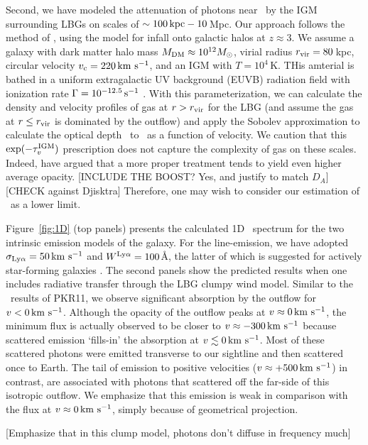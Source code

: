 \documentclass[12pt,preprint]{aastex}
\begin{document}
Second, we have modeled the attenuation of photons near \lya\ by the
IGM surrounding LBGs on scales of $\sim 100\,
{\rm kpc} - 10$\,Mpc.  Our approach follows the method of
\cite{santos04}, using the \cite{barkana04} model for infall onto
galactic halos at $z \approx 3$.  We assume a galaxy with dark matter
halo mass $M_{\rm DM} \approx 10^{12} M_\odot$, virial radius $r_{\rm vir} 
= 80$\,kpc, circular velocity $v_{\rm c} = 220 \, {\rm km~s^{-1}}$, and an
IGM with $T = 10^4$\,K.  THis amterial is bathed in a uniform
extragalactic UV
background (EUVB) radiation field with ionization rate $\Gamma =
10^{-12.5} \, \rm s^{-1}$ \citep{fpl+08}.  With this parameterization,
we can calculate the density and velocity profiles of gas at $r >
r_{\rm vir}$ for the LBG (and assume the gas at $r\le r_{\rm vir}$ is dominated by
the outflow) and apply the Sobolev approximation to calculate the
optical depth \tigm\ to \lya\ as a function of velocity.
We caution that
this $\exp(-\tau_v^{\rm IGM})$ prescription does not capture the complexity of
gas on these scales.  Indeed, \cite{zheng10a} have argued that a more
proper treatment tends to yield even higher average opacity.
[INCLUDE THE BOOST? Yes, and justify to match $D_A$]
[CHECK against Djisktra]
Therefore, one may wish to consider our estimation of \tigm\ as a
lower limit.

Figure~\ref{fig:1D} (top panels) presents the 
calculated 1D \lya\ spectrum for the
two intrinsic emission models of the galaxy.
For the line-emission, we have adopted $\sigma_{\rm Ly\alpha} =
50\, {\rm km~s^{-1}}$ and $W^{\rm Ly\alpha} = 100$\AA, the latter of which is suggested for
actively star-forming galaxies \citep{lya_emit}.
The second panels show the predicted results when one includes
radiative transfer through the LBG clumpy wind model.  Similar to the \mgii\
results of PKR11, we observe significant absorption by the outflow for
$v < 0\, {\rm km~s^{-1}}$.  
Although the opacity of the outflow peaks at $v \approx 0 \, {\rm km~s^{-1}}$, the
minimum flux is actually observed to be closer to $v \approx -300
\, {\rm km~s^{-1}}$ because
scattered emission `fills-in' the absorption at $v \lesssim 0
\, {\rm km~s^{-1}}$.  Most of these scattered photons were
emitted transverse to our sightline and then scattered once to
Earth.  The tail of emission to positive velocities ($v
\approx +500\, {\rm km~s^{-1}}$) in contrast, are associated with photons that
scattered off the far-side of this isotropic outflow.  
We emphasize that this emission is weak in comparison with the
flux at $v \approx 0 \, {\rm km~s^{-1}}$, simply because of geometrical projection.

[Emphasize that in this clump model, photons don't diffuse in
frequency much] 
\end{document}
